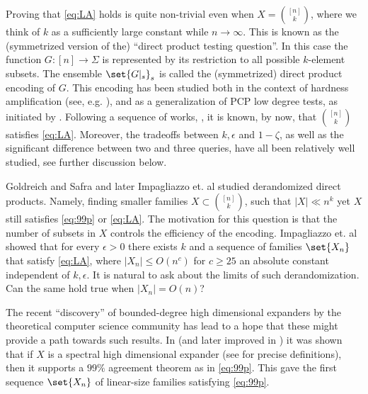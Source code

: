 \documentclass{article}[11pt]
\begin{document}
Proving that \eqref{eq:LA} holds is quite non-trivial even when $X=\binom{[n]}{k}$, where we think of $k$ as a sufficiently large constant while $n\to\infty$. This is known as the (symmetrized version of the) ``direct product testing question''. In this case the function $G:[n]\to\Sigma$ is represented by its restriction to all possible $k$-element subsets. The ensemble $\set{G|_s}_s$ is called the (symmetrized) direct product encoding of $G$. This encoding has been studied both in the context of hardness amplification (see, e.g. \cite{IJKW08}), and as a generalization of PCP low degree tests, as initiated by \cite{GolSaf97}. Following a sequence of works, \cite{GolSaf97,DinurR06, DinurG2008,ImpagliazzoKW2012, DinurS14, DinurL2017}, it is known, by now, that $\binom{[n]}k$ satisfies \eqref{eq:LA}. Moreover, the tradeoffs between $k,\epsilon$ and $1-\zeta$, as well as the significant difference between two and three queries, have all been relatively well studied, see further discussion below. 

Goldreich and Safra \cite{GolSaf97} and later Impagliazzo et. al \cite{ImpagliazzoKW2012} studied derandomized direct products. Namely, finding smaller families $X\subset \binom{[n]}k$, such that $|X| \ll n^k$ yet $X$ still satisfies \eqref{eq:99p} or \eqref{eq:LA}. The motivation for this question is that the number of subsets in $X$ controls the efficiency of the encoding. Impagliazzo et. al \cite{ImpagliazzoKW2012} showed that for every $\epsilon>0$ there exists $k$ and a sequence of families $\set{X_n}$ that satisfy \eqref{eq:LA}, where $|X_n|\leq O(n^{c})$ for $c\geq 25$ an absolute constant independent of $k,\epsilon$. It is natural to ask about the limits of such derandomization. Can the same hold true when $|X_n| = O(n)$? 

The recent ``discovery'' of bounded-degree high dimensional expanders by the theoretical computer science community has lead to a hope that these might provide a path towards such results.
In \cite{DinurK2017} (and later improved in \cite{DiksteinD2019}) it was shown that if $X$ is a spectral high dimensional expander (see  for precise definitions), then it supports a $99\%$ agreement theorem as in \eqref{eq:99p}. This gave the first sequence $\set{X_n}$ of linear-size families satisfying \eqref{eq:99p}. 
\end{document}

